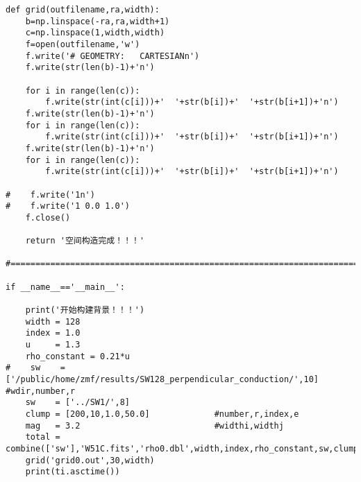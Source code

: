 \begin{lstlisting}
def grid(outfilename,ra,width):
    b=np.linspace(-ra,ra,width+1)
    c=np.linspace(1,width,width)
    f=open(outfilename,'w')
    f.write('# GEOMETRY:   CARTESIANn')
    f.write(str(len(b)-1)+'n')

    for i in range(len(c)):
        f.write(str(int(c[i]))+'  '+str(b[i])+'  '+str(b[i+1])+'n')
    f.write(str(len(b)-1)+'n')
    for i in range(len(c)):
        f.write(str(int(c[i]))+'  '+str(b[i])+'  '+str(b[i+1])+'n')
    f.write(str(len(b)-1)+'n')
    for i in range(len(c)):
        f.write(str(int(c[i]))+'  '+str(b[i])+'  '+str(b[i+1])+'n')

#    f.write('1n')
#    f.write('1 0.0 1.0')
    f.close()

    return '空间构造完成！！！'

#========================================================================

if __name__=='__main__':

    print('开始构建背景！！！')
    width = 128
    index = 1.0
    u     = 1.3
    rho_constant = 0.21*u
#    sw    = ['/public/home/zmf/results/SW128_perpendicular_conduction/',10]    #wdir,number,r
    sw    = ['../SW1/',8]
    clump = [200,10,1.0,50.0]             #number,r,index,e
    mag   = 3.2                           #widthi,widthj
    total = combine(['sw'],'W51C.fits','rho0.dbl',width,index,rho_constant,sw,clump,mag)
    grid('grid0.out',30,width)
    print(ti.asctime())

  \end{lstlisting}
